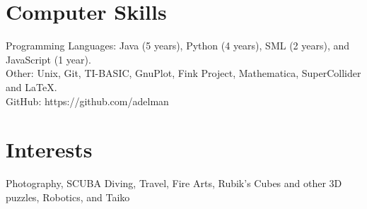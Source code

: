 \documentclass[11pt]{res} %
\begin{document}
\begin{resume}
 
\section{Computer Skills} 
Programming Languages: Java (5 years), Python (4 years), SML (2 years), and
JavaScript (1 year).\\
Other: Unix, Git, TI-BASIC, GnuPlot, Fink Project, Mathematica, SuperCollider
and \LaTeX.\\
GitHub: https://github.com/adelman

\section{Interests} 
Photography, SCUBA Diving, Travel, Fire Arts, Rubik's Cubes and other 3D
puzzles, Robotics, and Taiko 

\end{resume}
\end{document}
